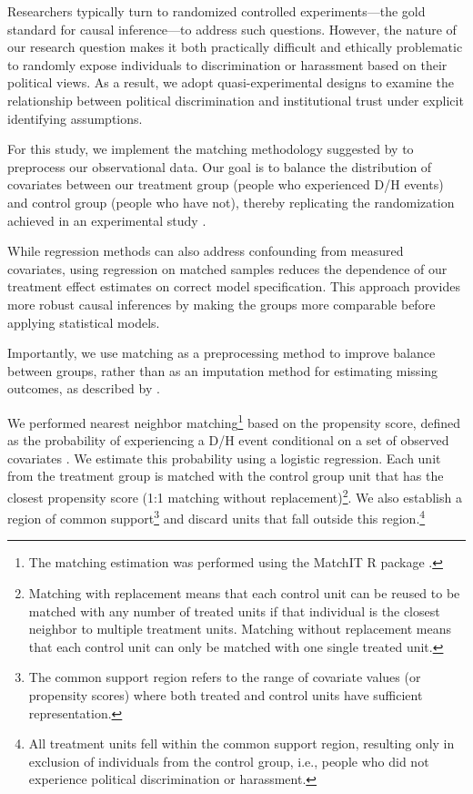 \documentclass{article}
\begin{document}
Researchers typically turn to randomized controlled experiments—the gold standard for causal inference—to address such questions. However, the nature of our research question makes it both practically difficult and ethically problematic to randomly expose individuals to discrimination or harassment based on their political views. As a result, we adopt quasi-experimental designs to examine the relationship between political discrimination and institutional trust under explicit identifying assumptions.

For this study, we implement the matching methodology suggested by \textcite{ho_matching_2007} to preprocess our observational data. Our goal is to balance the distribution of covariates between our treatment group (people who experienced D/H events) and control group (people who have not), thereby replicating the randomization achieved in an experimental study \parencite{stuart_matching_2010}.

While regression methods can also address confounding from measured covariates, using regression on matched samples reduces the dependence of our treatment effect estimates on correct model specification. This approach provides more robust causal inferences by making the groups more comparable before applying statistical models.

Importantly, we use matching as a preprocessing method to improve balance between groups, rather than as an imputation method for estimating missing outcomes, as described by \textcite{abadie_large_2006, abadie_matching_2016}.

We performed nearest neighbor matching\footnote{The matching estimation was performed using the MatchIT R package \parencite{ho_matchit_2011}.} based on the propensity score, defined as the probability of experiencing a D/H event conditional on a set of observed covariates \parencite{rubin_matching_1973, rosenbaum_central_1983}. We estimate this probability using a logistic regression. Each unit from the treatment group is matched with the control group unit that has the closest propensity score (1:1 matching without replacement)\footnote{Matching with replacement means that each control unit can be reused to be matched with any number of treated units if that individual is the closest neighbor to multiple treatment units. Matching without replacement means that each control unit can only be matched with one single treated unit.}. We also establish a region of common support\footnote{The common support region refers to the range of covariate values (or propensity scores) where both treated and control units have sufficient representation.} and discard units that fall outside this region.\footnote{All treatment units fell within the common support region, resulting only in exclusion of individuals from the control group, i.e., people who did not experience political discrimination or harassment.}
\end{document}
